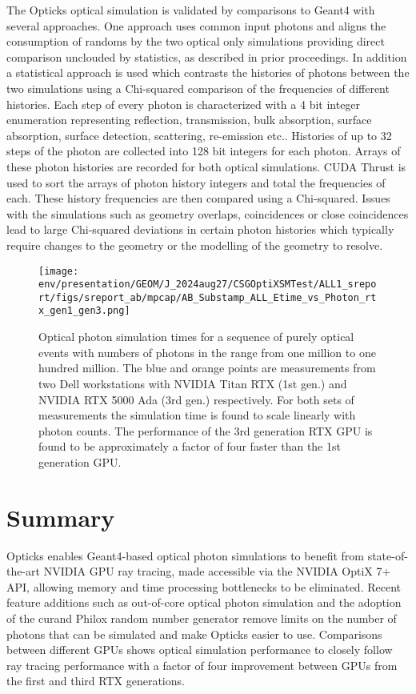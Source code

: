 \documentclass{webofc}
\begin{document}
The Opticks optical simulation is validated by comparisons to Geant4 with several approaches.
One approach uses common input photons and aligns the consumption of randoms by the two optical only simulations 
providing direct comparison unclouded by statistics, as described in prior proceedings\cite{chep2019}.   
In addition a statistical approach is used which contrasts the histories of photons between the 
two simulations using a Chi-squared comparison of the frequencies of different histories. 
Each step of every photon is characterized with a 4 bit integer enumeration representing reflection, 
transmission, bulk absorption, surface absorption, surface detection, scattering, re-emission etc..
Histories of up to 32 steps of the photon are collected into 128 bit integers for each photon.
Arrays of these photon histories are recorded for both optical simulations. CUDA Thrust is
used to sort the arrays of photon history integers and total the frequencies of each.  
These history frequencies are then compared using a Chi-squared. Issues with the 
simulations such as geometry overlaps, coincidences or close coincidences lead to
large Chi-squared deviations in certain photon histories which typically require
changes to the geometry or the modelling of the geometry to resolve.   
%
\begin{figure}
\centering
\texttt{[image: env/presentation/GEOM/J\_2024aug27/CSGOptiXSMTest/ALL1\_sreport/figs/sreport\_ab/mpcap/AB\_Substamp\_ALL\_Etime\_vs\_Photon\_rtx\_gen1\_gen3.png]}
\caption{%
Optical photon simulation times for a sequence of purely optical events with numbers of photons 
in the range from one million to one hundred million. The blue and orange points are measurements from 
two Dell workstations with NVIDIA Titan RTX (1st gen.) and NVIDIA RTX 5000 Ada (3rd gen.) respectively.
For both sets of measurements the simulation time is found to scale linearly with photon counts. The 
performance of the 3rd generation RTX GPU is found to be approximately a factor of four faster 
than the 1st generation GPU.%
}
\label{rtxgenscan}
\vspace{-5mm}
\end{figure}%
%
%
\section{Summary}
%
Opticks enables Geant4-based optical photon simulations to benefit from 
state-of-the-art NVIDIA GPU ray tracing, made accessible via the NVIDIA OptiX 7+ API,
allowing memory and time processing bottlenecks to be eliminated. 
Recent feature additions such as out-of-core optical photon simulation and the 
adoption of the curand Philox random number generator remove limits on the number of 
photons that can be simulated and make Opticks easier to use. 
Comparisons between different GPUs shows optical simulation performance 
to closely follow ray tracing performance with a factor of four improvement between 
GPUs from the first and third RTX generations. 
%
%
\newpage
\end{document}

